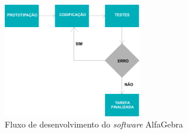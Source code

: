 \begin{figure}[htb]	
\center%
\includegraphics[width=6cm]{./img/fluxo.png}

\caption{Fluxo de desenvolvimento do \textit{software} AlfaGebra}

\end{figure}